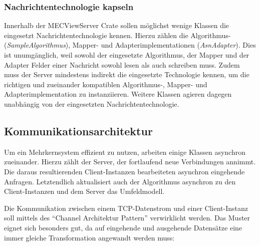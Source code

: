 \subsubsection{Nachrichtentechnologie kapseln}

Innerhalb der MECViewServer Crate sollen möglichst wenige Klassen die eingesetzt Nachrichtentechnologie kennen.
Hierzu zählen die Algorithmus- (\textit{SampleAlgorithmus}), Mapper- und Adapterimplementationen (\textit{AsnAdapter}).
Dies ist unumgänglich, weil sowohl der eingesetzte Algorithmus, der Mapper und der Adapter Felder einer Nachricht sowohl lesen als auch schreiben muss.
Zudem muss der Server mindestens indirekt die eingesetzte Technologie kennen, um die richtigen und zueinander kompatiblen Algorithmus-, Mapper- und Adapterimplementation zu instanziieren.
Weitere Klassen agieren dagegen unabhängig von der eingesetzten Nachrichtentechnologie.

\subsection{Kommunikationsarchitektur}
\label{design:communication:architecture}
\label{design:communication:architecture:async}

Um ein Mehrkernsystem effizient zu nutzen, arbeiten einige Klassen asynchron zueinander.
Hierzu zählt der Server, der fortlaufend neue Verbindungen annimmt.
Die daraus resultierenden Client-Instanzen bearbeiteten asynchron eingehende Anfragen.
Letztendlich aktualisiert auch der Algorithmus asynchron zu den Client-Instanzen und dem Server das Umfeldmodell.

Die Kommunikation zwischen einem TCP-Datenstrom und einer Client-Instanz soll mittels des \enquote{Channel Architektur Pattern} \cite[157]{douglass2003real} verwirklicht werden.
Das Muster eignet sich besonders gut, da auf eingehende und ausgehende Datensätze eine immer gleiche Transformation angewandt werden muss:

